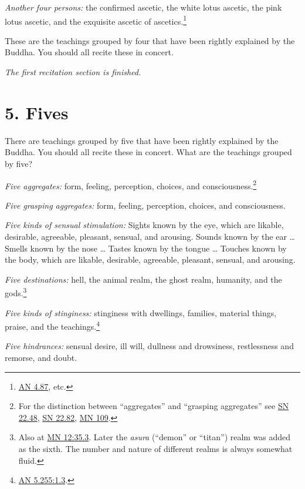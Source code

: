 \documentclass[12pt,openany]{book}%
\newcommand*{\scendsection}[1]{\begin{Center}\begin{small}\textit{#1}\end{small}\end{Center}\addvspace{1em}}
\begin{document}
\emph{Another four persons:} the confirmed ascetic, the white lotus ascetic, the pink lotus ascetic, and the exquisite ascetic of ascetics.\footnote{\href{https://suttacentral.net/an4.87/en/sujato}{AN 4.87}, etc. } 

These are the teachings grouped by four that have been rightly explained by the Buddha. You should all recite these in concert. 

\scendsection{The first recitation section is finished. }

\section*{5. Fives }

There are teachings grouped by five that have been rightly explained by the Buddha. You should all recite these in concert. What are the teachings grouped by five? 

\emph{Five aggregates:} form, feeling, perception, choices, and consciousness.\footnote{For the distinction between “aggregates” and “grasping aggregates” see \href{https://suttacentral.net/sn22.48/en/sujato}{SN 22.48}, \href{https://suttacentral.net/sn22.82/en/sujato}{SN 22.82}, \href{https://suttacentral.net/mn109/en/sujato}{MN 109}. } 

\emph{Five grasping aggregates:} form, feeling, perception, choices, and consciousness. 

\emph{Five kinds of sensual stimulation:} Sights known by the eye, which are likable, desirable, agreeable, pleasant, sensual, and arousing. Sounds known by the ear … Smells known by the nose … Tastes known by the tongue … Touches known by the body, which are likable, desirable, agreeable, pleasant, sensual, and arousing. 

\emph{Five destinations:} hell, the animal realm, the ghost realm, humanity, and the gods.\footnote{Also at \href{https://suttacentral.net/mn12/en/sujato\#35.3}{MN 12:35.3}. Later the \textit{asura} (“demon” or “titan”) realm was added as the sixth. The number and nature of different realms is always somewhat fluid. } 

\emph{Five kinds of stinginess:} stinginess with dwellings, families, material things, praise, and the teachings.\footnote{\href{https://suttacentral.net/an5.255/en/sujato\#1.3}{AN 5.255:1.3}. } 

\emph{Five hindrances:} sensual desire, ill will, dullness and drowsiness, restlessness and remorse, and doubt. 
\end{document}
